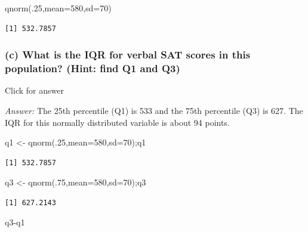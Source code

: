 \documentclass[
]{book}
\newenvironment{Shaded}{\begin{snugshade}}{\end{snugshade}}
\newcommand{\AttributeTok}[1]{\textcolor[rgb]{0.77,0.63,0.00}{#1}}
\newcommand{\DecValTok}[1]{\textcolor[rgb]{0.00,0.00,0.81}{#1}}
\newcommand{\FunctionTok}[1]{\textcolor[rgb]{0.00,0.00,0.00}{#1}}
\newcommand{\NormalTok}[1]{#1}
\newcommand{\OtherTok}[1]{\textcolor[rgb]{0.56,0.35,0.01}{#1}}
\newcommand{\SpecialCharTok}[1]{\textcolor[rgb]{0.00,0.00,0.00}{#1}}
\begin{document}
\begin{Shaded}
\begin{Highlighting}[]
\FunctionTok{qnorm}\NormalTok{(.}\DecValTok{25}\NormalTok{,}\AttributeTok{mean=}\DecValTok{580}\NormalTok{,}\AttributeTok{sd=}\DecValTok{70}\NormalTok{)}
\end{Highlighting}
\end{Shaded}

\begin{verbatim}
[1] 532.7857
\end{verbatim}

\hypertarget{c-what-is-the-iqr-for-verbal-sat-scores-in-this-population-hint-find-q1-and-q3}{%
\subsubsection{(c) What is the IQR for verbal SAT scores in this population? (Hint: find Q1 and Q3)}\label{c-what-is-the-iqr-for-verbal-sat-scores-in-this-population-hint-find-q1-and-q3}}

Click for answer

\emph{Answer:} The 25th percentile (Q1) is 533 and the 75th percentile (Q3) is 627. The IQR for this normally distributed variable is about 94 points.

\begin{Shaded}
\begin{Highlighting}[]
\NormalTok{q1 }\OtherTok{\textless{}{-}} \FunctionTok{qnorm}\NormalTok{(.}\DecValTok{25}\NormalTok{,}\AttributeTok{mean=}\DecValTok{580}\NormalTok{,}\AttributeTok{sd=}\DecValTok{70}\NormalTok{);q1}
\end{Highlighting}
\end{Shaded}

\begin{verbatim}
[1] 532.7857
\end{verbatim}

\begin{Shaded}
\begin{Highlighting}[]
\NormalTok{q3 }\OtherTok{\textless{}{-}} \FunctionTok{qnorm}\NormalTok{(.}\DecValTok{75}\NormalTok{,}\AttributeTok{mean=}\DecValTok{580}\NormalTok{,}\AttributeTok{sd=}\DecValTok{70}\NormalTok{);q3}
\end{Highlighting}
\end{Shaded}

\begin{verbatim}
[1] 627.2143
\end{verbatim}

\begin{Shaded}
\begin{Highlighting}[]
\NormalTok{q3}\SpecialCharTok{{-}}\NormalTok{q1}
\end{Highlighting}
\end{Shaded}
\end{document}

